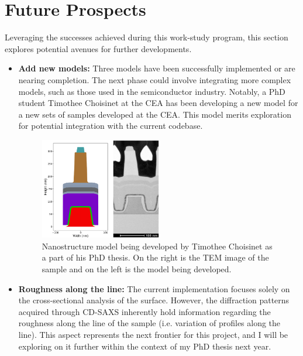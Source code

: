 \section{Future Prospects}

Leveraging the successes achieved during this work-study program, this section explores potential avenues for further developments.

\begin{itemize}
    \item \textbf{Add new models:} Three models have been successfully implemented or are 
    nearing completion. The next phase could involve integrating more complex models, 
    such as those used in the semiconductor industry. Notably, a PhD student Timothee Choisinet at the CEA has been developing a new model for a new
    sets of samples developed at the CEA. This model merits exploration for potential integration with the current codebase.

    \begin{figure}[h]
        \centering
        \includegraphics[width=0.5\textwidth]{images/Modele_Timothee.png}
        \caption{Nanostructure model being developed by Timothee Choisinet as a part of his PhD thesis. 
        On the right is the TEM image of the sample and on the left is the model being developed.}
    \end{figure}

    \item \textbf{Roughness along the line:} The current implementation focuses solely on the
    cross-sectional analysis of the surface. However, the diffraction patterns acquired 
    through CD-SAXS inherently hold information regarding the roughness along the line of the 
    sample (i.e. variation of profiles along the line). This aspect represents the next frontier for this project, and I will be exploring 
    on it further within the context of my PhD thesis next year.


\end{itemize}
